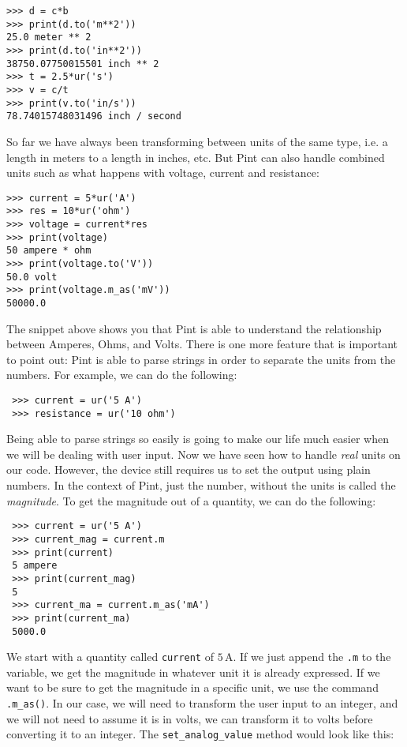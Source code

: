\begin{verbatim}
>>> d = c*b
>>> print(d.to('m**2'))
25.0 meter ** 2
>>> print(d.to('in**2'))
38750.07750015501 inch ** 2
>>> t = 2.5*ur('s')
>>> v = c/t
>>> print(v.to('in/s'))
78.74015748031496 inch / second
\end{verbatim}

So far we have always been transforming between units of the same type, i.e. a length in meters to a length in inches, etc. But Pint can also handle combined units such as what happens with voltage, current and resistance:

\begin{verbatim}
>>> current = 5*ur('A')
>>> res = 10*ur('ohm')
>>> voltage = current*res
>>> print(voltage)
50 ampere * ohm
>>> print(voltage.to('V'))
50.0 volt
>>> print(voltage.m_as('mV'))
50000.0
\end{verbatim}

The snippet above shows you that Pint is able to understand the relationship between Amperes, Ohms, and Volts. There is one more feature that is important to point out: Pint is able to parse strings in order to separate the units from the numbers. For example, we can do the following:

\begin{verbatim}
 >>> current = ur('5 A')
 >>> resistance = ur('10 ohm')
\end{verbatim}

Being able to parse strings so easily is going to make our life much easier when we will be dealing with user input. Now we have seen how to handle \emph{real} units on our code. However, the device still requires us to set the output using plain numbers. In the context of Pint, just the number, without the units is called the \emph{magnitude}. To get the magnitude out of a quantity, we can do the following:

\begin{verbatim}
 >>> current = ur('5 A')
 >>> current_mag = current.m
 >>> print(current)
 5 ampere
 >>> print(current_mag)
 5
 >>> current_ma = current.m_as('mA')
 >>> print(current_ma)
 5000.0
\end{verbatim}

We start with a quantity called \texttt{current} of $5\,\textrm{A}$. If we just append the \texttt{.m} to the variable, we get the magnitude in whatever unit it is already expressed. If we want to be sure to get the magnitude in a specific unit, we use the command \texttt{.m\_as()}. In our case, we will need to transform the user input to an integer, and we will not need to assume it is in volts, we can transform it to volts before converting it to an integer. The \texttt{set\_analog\_value} method would look like this:

